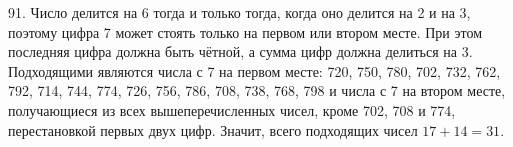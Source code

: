 91. Число делится на 6 тогда и только тогда, когда оно делится на 2 и на 3, поэтому цифра 7 может стоять только на первом или втором месте. При этом последняя цифра должна быть чётной, а сумма цифр должна делиться на 3. Подходящими являются числа с 7 на первом месте: 720, 750, 780, 702, 732, 762, 792, 714, 744, 774, 726, 756, 786, 708, 738, 768, 798 и числа с 7 на втором месте, получающиеся из всех вышеперечисленных чисел, кроме 702, 708 и 774, перестановкой первых двух цифр. Значит, всего подходящих чисел $17+14=31.$\\
